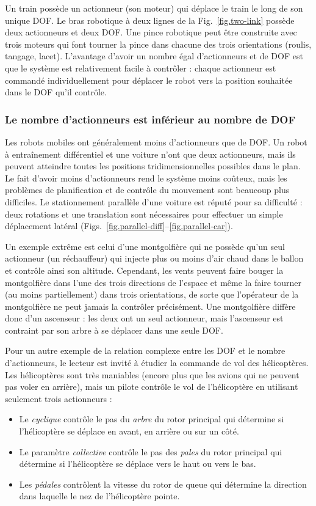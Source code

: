 {Un train possède un actionneur (son moteur) qui déplace le train le long de son unique DOF. Le bras robotique à deux lignes de la Fig.~\ref{fig.two-link} possède deux actionneurs et deux DOF. Une pince robotique peut être construite avec trois moteurs qui font tourner la pince dans chacune des trois orientations (roulis, tangage, lacet). L'avantage d'avoir un nombre égal d'actionneurs et de DOF est que le système est relativement facile à contrôler : chaque actionneur est commandé individuellement pour déplacer le robot vers la position souhaitée dans le DOF qu'il contrôle.

\subsubsection*{Le nombre d'actionneurs est inférieur au nombre de DOF}

Les robots mobiles ont généralement moins d'actionneurs que de DOF. Un robot à entraînement différentiel et une voiture n'ont que deux actionneurs, mais ils peuvent atteindre toutes les positions tridimensionnelles possibles dans le plan. Le fait d'avoir moins d'actionneurs rend le système moins coûteux, mais les problèmes de planification et de contrôle du mouvement sont beaucoup plus difficiles. Le stationnement parallèle d'une voiture est réputé pour sa difficulté : deux rotations et une translation sont nécessaires pour effectuer un simple déplacement latéral (Figs.~\ref{fig.parallel-diff}--\ref{fig.parallel-car}).

Un exemple extrême est celui d'une montgolfière qui ne possède qu'un seul actionneur (un réchauffeur) qui injecte plus ou moins d'air chaud dans le ballon et contrôle ainsi son altitude. Cependant, les vents peuvent faire bouger la montgolfière dans l'une des trois directions de l'espace et même la faire tourner (au moins partiellement) dans trois orientations, de sorte que l'opérateur de la montgolfière ne peut jamais la contrôler précisément. Une montgolfière diffère donc d'un ascenseur : les deux ont un seul actionneur, mais l'ascenseur est contraint par son arbre à se déplacer dans une seule DOF.

Pour un autre exemple de la relation complexe entre les DOF et le nombre d'actionneurs, le lecteur est invité à étudier la commande de vol des hélicoptères. Les hélicoptères sont très maniables (encore plus que les avions qui ne peuvent pas voler en arrière), mais un pilote contrôle le vol de l'hélicoptère en utilisant seulement trois actionneurs :
\begin{itemize}
\item Le \emph{cyclique} contrôle le pas du \emph{arbre} du rotor principal qui détermine si l'hélicoptère se déplace en avant, en arrière ou sur un côté.
\item Le paramètre \emph{collective} contrôle le pas des \emph{pales} du rotor principal qui détermine si l'hélicoptère se déplace vers le haut ou vers le bas.
\item Les \emph{pédales} contrôlent la vitesse du rotor de queue qui détermine la direction dans laquelle le nez de l'hélicoptère pointe.
\end{itemize}

}
